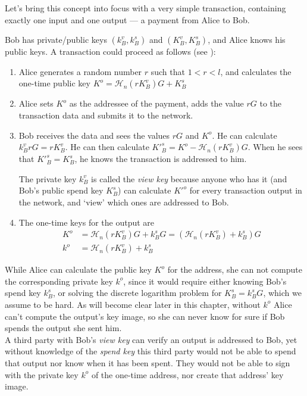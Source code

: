Let’s bring this concept into focus with a very simple transaction, containing exactly one input and one output --- a payment from Alice to Bob.

Bob has private/public keys $(k_B^v, k_B^s)$ and $(K_B^v, K_B^s)$, and Alice knows his public keys. A transaction could proceed as follows (see  \cite{cryptoNoteWhitePaper}):


\begin{enumerate}
	\item Alice generates a random number $r$ such that $1 < r < l$, and calculates the one-time public key $K^o  = \mathcal{H}_n(r K_B^v)G + K_B^s$ 

	\item Alice sets $K^o$ as the addressee of the payment, adds the value $r G$ to the transaction data and submits it to the network.
	
	\item 	Bob receives the data and sees the values $r G$ and $K^o$. He can calculate $k_B^v r G = r K_B^v$. He can then calculate $K'^s_B = K^o - \mathcal{H}_n(r K_B^v)G$. When he sees that $K'^s_B = K_B^s$, he knows the transaction is addressed to him.
	
	The private key $k_B^v$ is called the {\em view key} because anyone who has it (and Bob’s public spend key $K_B^s$) can calculate $K'^o$ for every transaction output in the network, and ‘view’ which ones are addressed to Bob.
	
	\item The one-time keys for the output are
	\begin{align*}
		K^o &= \mathcal{H}_n(r K_B^v)G + k_B^s G = (\mathcal{H}_n(r K_B^v) + k_B^s)G  \\ 
		k^o &= \mathcal{H}_n(r K_B^v) + k_B^s
	\end{align*}
\end{enumerate}

While Alice can calculate the public key $K^o$ for the address, she can not compute the corresponding private key $k^o$, since it would require either knowing Bob’s spend key $k_B^s$, or solving the discrete logarithm problem for $K_B^s = k_B^s G$, which we assume to be hard. As will become clear later in this chapter, without $k^o$ Alice can't compute the output's key image, so she can never know for sure if Bob spends the output she sent him.
\\

A third party with Bob’s {\em view key} can verify an output is addressed to Bob, yet without knowledge of the {\em spend key} this third party would not be able to spend that output nor know when it has been spent. They would not be able to sign with the private key $k^o$ of the one-time address, nor create that address' key image.

